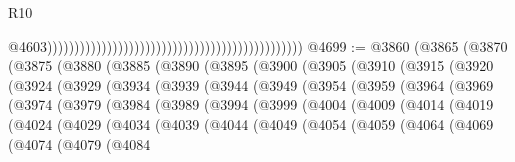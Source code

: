 \begin{lexlean}{R10}
\begin{coremodule}
{{{{{{{{{{{{{{{{{{{{{{{{{{{{{{{{{{{{{{{{{{{{{{{{{{{{{{{{{{{{{{{{{{{{{{{{{{{{{{{{{{{{                                                                                                  @4603)))))))))))))))))))))))))))))))))))))))))))))))
@4699 := @3860
    (@3865
      (@3870
        (@3875
          (@3880
            (@3885
              (@3890
                (@3895
                  (@3900
                    (@3905
                      (@3910
                        (@3915
                          (@3920
                            (@3924
                              (@3929
                                (@3934
                                  (@3939
                                    (@3944
                                      (@3949
                                        (@3954
                                          (@3959
                                            (@3964
                                              (@3969
                                                (@3974
                                                  (@3979
                                                    (@3984
                                                      (@3989
                                                        (@3994
                                                          (@3999
                                                            (@4004
                                                              (@4009
                                                                (@4014
                                                                  (@4019
                                                                    (@4024
                                                                      (@4029
                                                                        (@4034
                                                                          (@4039
                                                                            (@4044
                                                                              (@4049
                                                                                (@4054
                                                                                  (@4059
                                                                                    (@4064
                                                                                      (@4069
                                                                                        (@4074
                                                                                          (@4079
                                                                                            (@4084
}}}}}}}}}}}}}}}}}}}}}}}}}}}}}}}}}}}}}}}}}}}}}}}}}}}}}}}}}}}}}}}}}}}}}}}}}}}}}}}}}}}}
\end{coremodule}
\end{lexlean}
